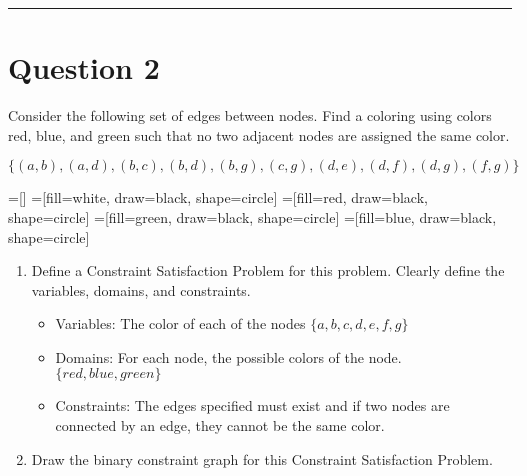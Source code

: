 \documentclass[11pt]{article}
\begin{document}
\begin{flushleft}
\rule[0.1pt]{40em}{1.0pt}

\section*{Question 2}
Consider the following set of edges between nodes. Find a coloring using colors
red, blue, and green such that no two adjacent nodes are assigned the same
color.

\begin{center}
$\{ (a, b),(a, d),(b, c),(b, d),(b, g),(c, g),(d, e),(d, f),(d, g),(f, g) \}$
\end{center}

=[]
=[fill=white, draw=black, shape=circle]
=[fill=red, draw=black, shape=circle]
=[fill=green, draw=black, shape=circle]
=[fill=blue, draw=black, shape=circle]

\begin{enumerate}[label=(\alph*)]
\itemsep1em

    \item Define a Constraint Satisfaction Problem for this problem. Clearly
        define the variables, domains, and constraints.

        \begin{itemize}
            \item Variables: The color of each of the nodes $\{a, b, c, d, e, f,
                g\}$
            \item Domains: For each node, the possible colors of the node. $\{
                    red, blue, green\}$
            \item Constraints: The edges specified must exist and if two nodes
                are connected by an edge, they cannot be the same color.
        \end{itemize}
        
    \item Draw the binary constraint graph for this Constraint Satisfaction
        Problem.


\end{enumerate}
\end{flushleft}
\end{document}
